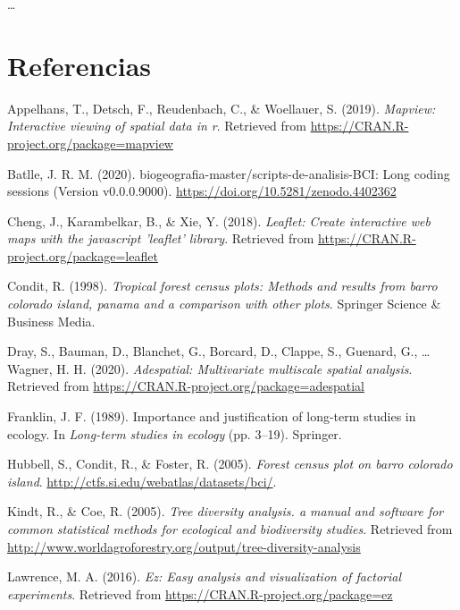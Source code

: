 \documentclass[11pt,]{article}
\begin{document}
\ldots

\section*{Referencias}\label{referencias}

\hypertarget{refs}{}
\hypertarget{ref-MapView}{}
Appelhans, T., Detsch, F., Reudenbach, C., \& Woellauer, S. (2019).
\emph{Mapview: Interactive viewing of spatial data in r}. Retrieved from
\url{https://CRAN.R-project.org/package=mapview}

\hypertarget{ref-jose_ramon_martinez_batlle_2020_4402362}{}
Batlle, J. R. M. (2020). biogeografia-master/scripts-de-analisis-BCI:
Long coding sessions (Version v0.0.0.9000).
\url{https://doi.org/10.5281/zenodo.4402362}

\hypertarget{ref-Leaflet}{}
Cheng, J., Karambelkar, B., \& Xie, Y. (2018). \emph{Leaflet: Create
interactive web maps with the javascript 'leaflet' library}. Retrieved
from \url{https://CRAN.R-project.org/package=leaflet}

\hypertarget{ref-condit1998tropical}{}
Condit, R. (1998). \emph{Tropical forest census plots: Methods and
results from barro colorado island, panama and a comparison with other
plots}. Springer Science \& Business Media.

\hypertarget{ref-adespatial}{}
Dray, S., Bauman, D., Blanchet, G., Borcard, D., Clappe, S., Guenard,
G., \ldots{} Wagner, H. H. (2020). \emph{Adespatial: Multivariate
multiscale spatial analysis}. Retrieved from
\url{https://CRAN.R-project.org/package=adespatial}

\hypertarget{ref-franklin1989importance}{}
Franklin, J. F. (1989). Importance and justification of long-term
studies in ecology. In \emph{Long-term studies in ecology} (pp. 3--19).
Springer.

\hypertarget{ref-Hubbell2005Barro}{}
Hubbell, S., Condit, R., \& Foster, R. (2005). \emph{Forest census plot
on barro colorado island}.
\url{http://ctfs.si.edu/webatlas/datasets/bci/}.

\hypertarget{ref-Biodiv}{}
Kindt, R., \& Coe, R. (2005). \emph{Tree diversity analysis. a manual
and software for common statistical methods for ecological and
biodiversity studies}. Retrieved from
\url{http://www.worldagroforestry.org/output/tree-diversity-analysis}

\hypertarget{ref-EZ}{}
Lawrence, M. A. (2016). \emph{Ez: Easy analysis and visualization of
factorial experiments}. Retrieved from
\url{https://CRAN.R-project.org/package=ez}
\end{document}
